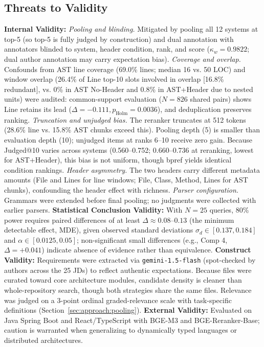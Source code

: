 \subsection{Threats to Validity}
\textbf{Internal Validity:} \textit{Pooling and blinding.} Mitigated by pooling all 12 systems at top-5 (so top-5 is fully judged by construction) and dual annotation with annotators blinded to system, header condition, rank, and score ($\kappa_w = 0.9822$; dual author annotation may carry expectation bias). \textit{Coverage and overlap.} Confounds from AST line coverage (69.0\% lines; median 16 vs. 50 LOC) and window overlap (26.4\% of Line top-10 slots involved in overlap [16.8\% redundant], vs. 0\% in AST No-Header and 0.8\% in AST+Header due to nested units) were audited: common-support evaluation ($N=826$ shared pairs) shows Line retains its lead ($\Delta = -0.111, p_{\mathrm{Holm}} = 0.0036$), and deduplication preserves ranking. \textit{Truncation and unjudged bias.} The reranker truncates at 512 tokens (28.6\% line vs. 15.8\% AST chunks exceed this). Pooling depth (5) is smaller than evaluation depth (10); unjudged items at ranks 6--10 receive zero gain. Because Judged@10 varies across systems (0.560--0.752; 0.660--0.736 at reranking, lowest for AST+Header), this bias is not uniform, though bpref yields identical condition rankings. \textit{Header asymmetry.} The two headers carry different metadata amounts (File and Lines for line windows; File, Class, Method, Lines for AST chunks), confounding the header effect with richness. \textit{Parser configuration.} Grammars were extended before final pooling; no judgments were collected with earlier parsers.
\textbf{Statistical Conclusion Validity:} With $N = 25$ queries, 80\% power requires paired differences of at least $\Delta \approx 0.08$--$0.13$ (the minimum detectable effect, MDE), given observed standard deviations $\sigma_d \in [0.137, 0.184]$ and $\alpha \in [0.0125, 0.05]$; non-significant small differences (e.g., Comp 4, $\Delta = +0.041$) indicate absence of evidence rather than equivalence.
\textbf{Construct Validity:} Requirements were extracted via \texttt{gemini-1.5-flash} (spot-checked by authors across the 25 JDs) to reflect authentic expectations. Because files were curated toward core architecture modules, candidate density is cleaner than whole-repository search, though both strategies share the same files. Relevance was judged on a 3-point ordinal graded-relevance scale with task-specific definitions (Section~\ref{sec:approach:pooling}). 
\textbf{External Validity:} Evaluated on Java Spring Boot and React/TypeScript with BGE-M3 and BGE-Reranker-Base; caution is warranted when generalizing to dynamically typed languages or distributed architectures.
